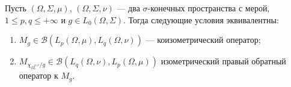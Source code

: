 \begin{proposition}\label{CoisomMultOpDescBtwnTwoMeasSp} Пусть
$(\Omega,\Sigma,\mu)$, $(\Omega,\Sigma,\nu)$ --- два $\sigma$-конечных
пространства с мерой, $1\leq p,q\leq +\infty$ и $g\in L_0(\Omega,\Sigma)$. Тогда
следующие условия эквивалентны: 

\begin{enumerate}[label = (\roman*)]
    \item $M_g\in\mathcal{B}(L_p(\Omega,\mu),L_q(\Omega,\nu))$ --- 
    коизометрический оператор;

    \item $M_{\chi_{\Omega_c^{\mu,\nu}}/g}\in\mathcal{B}(L_q(\Omega,\nu),
    L_p(\Omega,\mu))$ изометрический  правый обратный оператор к $M_g$.
\end{enumerate}
\end{proposition}
